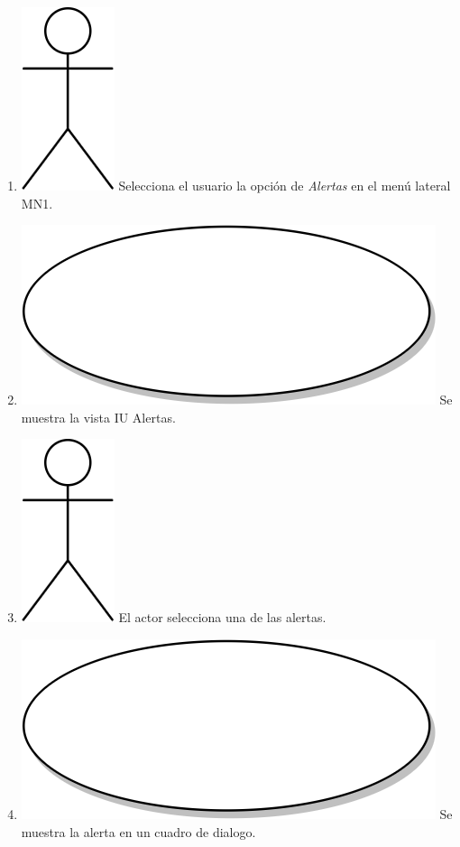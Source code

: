 \begin{enumerate}
\item {\includegraphics[scale=.1]{Capitulo3/img/actor.png} Selecciona el usuario la opción de \textit{Alertas} en el menú lateral MN1.}
\item {\includegraphics[scale=.05]{Capitulo3/img/proceso.png} Se muestra la vista IU Alertas.}
\item {\includegraphics[scale=.1]{Capitulo3/img/actor.png} El actor selecciona una de las alertas.}
\item {\includegraphics[scale=.05]{Capitulo3/img/proceso.png} Se muestra la alerta en un cuadro de dialogo.}

\end{enumerate}
